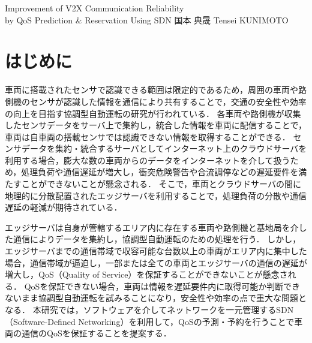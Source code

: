\documentclass[a4paper,10pt,twocolumn,uplatex]{jsarticle}
\date{10}
\begin{document}
{Improvement of V2X Communication Reliability\\by QoS Prediction \& Reservation Using SDN}
{国本 典晟}
{Tensei KUNIMOTO}

\section{はじめに}
車両に搭載されたセンサで認識できる範囲は限定的であるため，周囲の車両や路側機のセンサが認識した情報を通信により共有することで，交通の安全性や効率の向上を目指す協調型自動運転の研究が行われている\cite{Cooperative}．
各車両や路側機が収集したセンサデータをサーバ上で集約し，統合した情報を車両に配信することで，車両は自車両の搭載センサでは認識できない情報を取得することができる．
センサデータを集約・統合するサーバとしてインターネット上のクラウドサーバを利用する場合，膨大な数の車両からのデータをインターネットを介して扱うため，処理負荷や通信遅延が増大し，衝突危険警告や合流調停などの遅延要件を満たすことができないことが懸念される．
そこで，車両とクラウドサーバの間に地理的に分散配置されたエッジサーバを利用することで，処理負荷の分散や通信遅延の軽減が期待されている\cite{MEC}．\par
エッジサーバは自身が管轄するエリア内に存在する車両や路側機と基地局を介した通信によりデータを集約し，協調型自動運転のための処理を行う．
しかし，エッジサーバまでの通信帯域で収容可能な台数以上の車両がエリア内に集中した場合，通信帯域が逼迫し，一部または全ての車両とエッジサーバの通信の遅延が増大し，QoS（Quality of Service）を保証することができないことが懸念される\cite{QoS}．
QoSを保証できない場合，車両は情報を遅延要件内に取得可能か判断できないまま協調型自動運転を試みることになり，安全性や効率の点で重大な問題となる．
本研究では，ソフトウェアを介してネットワークを一元管理するSDN（Software-Defined Networking）を利用して，QoSの予測・予約を行うことで車両の通信のQoSを保証することを提案する．

\end{document}
